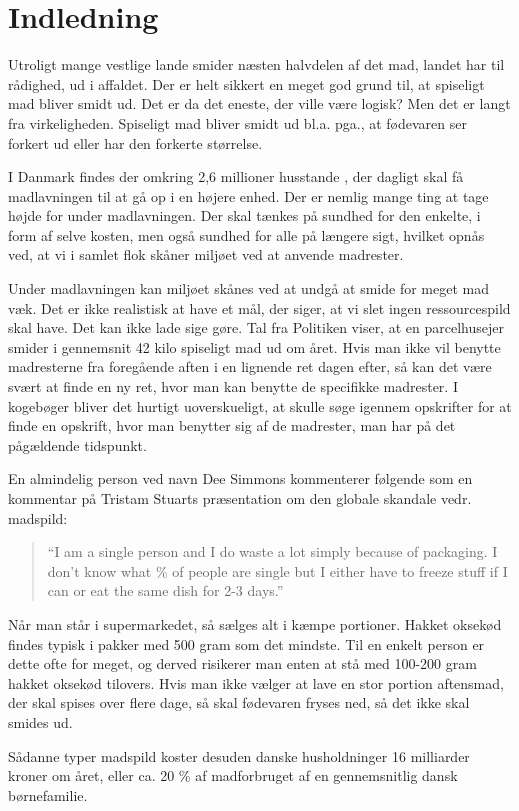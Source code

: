 \section{Indledning}
\label{sec:indledning}

Utroligt mange vestlige lande smider næsten halvdelen af det mad, landet har til rådighed, ud i affaldet. Der er helt sikkert en meget god grund til, at spiseligt mad bliver smidt ud. Det er da det eneste, der ville være logisk? Men det er langt fra virkeligheden. Spiseligt mad bliver smidt ud bl.a. pga., at fødevaren ser forkert ud eller har den forkerte størrelse.\cite{tedmadspild}

I Danmark findes der omkring 2,6 millioner husstande \cite{husstande}, der dagligt skal få madlavningen til at gå op i en højere enhed. Der er nemlig mange ting at tage højde for under madlavningen. Der skal tænkes på sundhed for den enkelte, i form af selve kosten, men også sundhed for alle på længere sigt, hvilket opnås ved, at vi i samlet flok skåner miljøet ved at anvende madrester.

Under madlavningen kan miljøet skånes ved at undgå at smide for meget mad væk. Det er ikke realistisk at have et mål, der siger, at vi slet ingen ressourcespild skal have. Det kan ikke lade sige gøre. \cite{tedmadspild} Tal fra Politiken viser, at en parcelhusejer smider i gennemsnit 42 kilo spiseligt mad ud om året. \cite{madspildpol} Hvis man ikke vil benytte madresterne fra foregående aften i en lignende ret dagen efter, så kan det være svært at finde en ny ret, hvor man kan benytte de specifikke madrester. I kogebøger bliver det hurtigt uoverskueligt, at skulle søge igennem opskrifter for at finde en opskrift, hvor man benytter sig af de madrester, man har på det pågældende tidspunkt.

En almindelig person ved navn Dee Simmons kommenterer følgende\cite{madspildcomment} som en kommentar på Tristam Stuarts præsentation om den globale skandale vedr. madspild:

\begin{quote}
``I am a single person and I do waste a lot simply because of packaging. I don't know what \% of people are single but I either have to freeze stuff if I can or eat the same dish for 2-3 days.''
\end{quote}

Når man står i supermarkedet, så sælges alt i kæmpe portioner. Hakket oksekød findes typisk i pakker med 500 gram som det mindste. Til en enkelt person er dette ofte for meget, og derved risikerer man enten at stå med 100-200 gram hakket oksekød tilovers. Hvis man ikke vælger at lave en stor portion aftensmad, der skal spises over flere dage, så skal fødevaren fryses ned, så det ikke skal smides ud. 

Sådanne typer madspild koster desuden danske husholdninger 16 milliarder kroner om året, eller ca. 20 \% af madforbruget af en gennemsnitlig dansk børnefamilie. \cite{madspild16}
